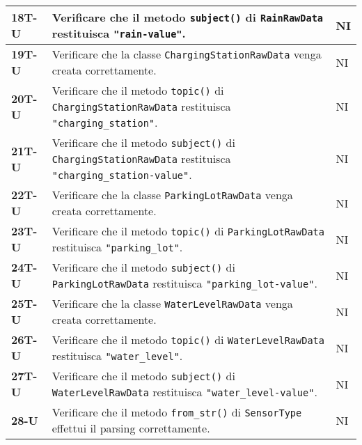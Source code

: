 \begin{longtable}{|>{\raggedright\arraybackslash}m{}|>{\raggedright\arraybackslash}m{}|>{\raggedright\arraybackslash}m{}|}
	\hline
	\textbf{18T-U}  & Verificare che il metodo \texttt{subject()} di \texttt{RainRawData} restituisca \texttt{"rain-value"}.                                                            & NI             \\
	\hline
	\textbf{19T-U}  & Verificare che la classe \texttt{ChargingStationRawData} venga creata correttamente.                                                                              & NI             \\
	\hline
	\textbf{20T-U}  & Verificare che il metodo \texttt{topic()} di \texttt{ChargingStationRawData} restituisca \texttt{"charging\_station"}.                                            & NI             \\
	\hline
	\textbf{21T-U}  & Verificare che il metodo \texttt{subject()} di \texttt{ChargingStationRawData} restituisca \texttt{"charging\_station-value"}.                                    & NI             \\
	\hline
	\textbf{22T-U}  & Verificare che la classe \texttt{ParkingLotRawData} venga creata correttamente.                                                                                   & NI             \\
	\hline
	\textbf{23T-U}  & Verificare che il metodo \texttt{topic()} di \texttt{ParkingLotRawData} restituisca \texttt{"parking\_lot"}.                                                      & NI             \\
	\hline
	\textbf{24T-U}  & Verificare che il metodo \texttt{subject()} di \texttt{ParkingLotRawData} restituisca \texttt{"parking\_lot-value"}.                                              & NI             \\
	\hline
	\textbf{25T-U}  & Verificare che la classe \texttt{WaterLevelRawData} venga creata correttamente.                                                                                   & NI             \\
	\hline
	\textbf{26T-U}  & Verificare che il metodo \texttt{topic()} di \texttt{WaterLevelRawData} restituisca \texttt{"water\_level"}.                                                      & NI             \\
	\hline
	\textbf{27T-U}  & Verificare che il metodo \texttt{subject()} di \texttt{WaterLevelRawData} restituisca \texttt{"water\_level-value"}.                                              & NI             \\
	\hline
	\textbf{28-U}   & Verificare che il metodo \texttt{from\_str()} di \texttt{SensorType} effettui il parsing correttamente.                                                           & NI             \\

\end{longtable}
